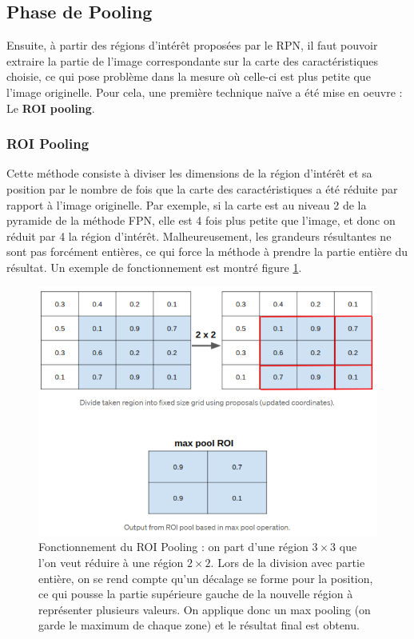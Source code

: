\subsection{Phase de Pooling}

Ensuite, à partir des régions d'intérêt proposées par le RPN, il faut pouvoir extraire la partie de l'image correspondante sur la carte des caractéristiques choisie, ce qui pose problème dans la mesure où celle-ci est plus petite que l'image originelle. Pour cela, une première technique naïve a été mise en oeuvre : Le \textbf{ROI pooling}. 

\subsubsection{ROI Pooling}

Cette méthode consiste à diviser les dimensions de la région d'intérêt  et sa position par le nombre de fois que la carte des caractéristiques   a été réduite par rapport à l'image originelle. Par exemple, si la carte est au niveau 2 de la pyramide de la méthode FPN, elle est 4 fois plus petite que l'image, et donc on réduit par 4 la région d'intérêt. Malheureusement, les grandeurs résultantes ne sont pas forcément entières, ce qui force la méthode à prendre la partie entière du résultat. Un exemple de fonctionnement est montré figure \ref{ROI_Pooling}.

\begin{figure}[!h]
\centering
\includegraphics[width=200pts]{images/Mask_R_CNN/ROI_Pooling.png} 
\caption{Fonctionnement du ROI Pooling : on part d'une région $3 \times 3$ que l'on veut réduire à une région $2 \times 2$. Lors de la division avec partie entière, on se rend compte qu'un décalage se forme pour la position, ce qui pousse la partie supérieure gauche de la nouvelle région à représenter plusieurs valeurs. On applique donc un max pooling (on garde le maximum de chaque zone) et le résultat final est obtenu.}
\label{ROI_Pooling}
\end{figure}

